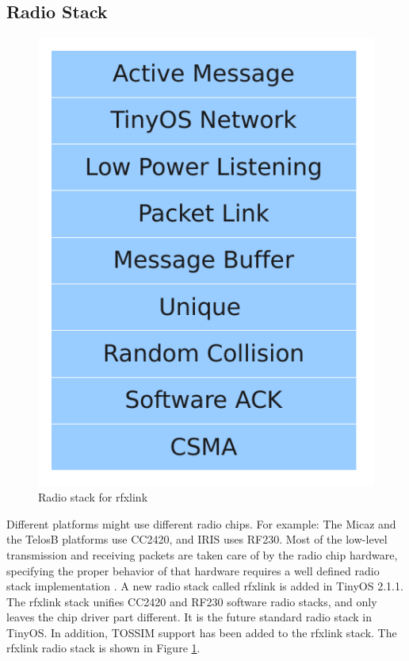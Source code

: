 \subsection{Radio Stack}
\label{Sim:radio stack}
\begin{figure}[htbp]
  \begin{center}
    \leavevmode
      \includegraphics[scale=0.5]{Pics/Rfxlinklayer.pdf}
   \caption{Radio stack for rfxlink}
    \label{fig:rfxlinklayer}
  \end{center}
\end{figure}
Different platforms might use different radio chips. For example: The Micaz and the TelosB platforms use CC2420, and IRIS uses RF230. Most of the low-level transmission and receiving packets are taken care of by the radio chip hardware, specifying the proper behavior of that hardware requires a well defined radio stack implementation \cite{TEP 126}.
A new radio stack called rfxlink is added in TinyOS 2.1.1. The rfxlink stack unifies CC2420 and RF230 software radio stacks, and only leaves the chip driver part different. It is the future standard radio stack in TinyOS. In addition, TOSSIM support has been added to the rfxlink stack.
The rfxlink radio stack is shown in Figure \ref{fig:rfxlinklayer}.

